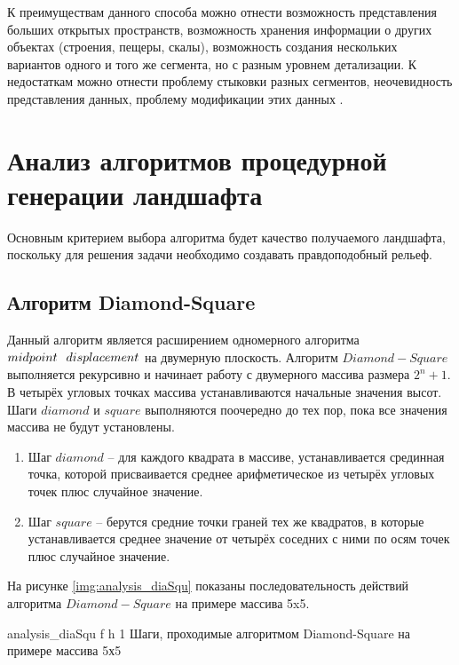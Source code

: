 К преимуществам данного способа можно отнести возможность представления больших открытых пространств, возможность хранения информации о других объектах (строения, пещеры, скалы), возможность создания нескольких вариантов одного и того же сегмента, но с разным уровнем детализации. 
К недостаткам можно отнести проблему стыковки разных сегментов, неочевидность представления данных, проблему модификации этих данных \cite{info_dataLandscapePresent}.

\section{Анализ алгоритмов процедурной генерации ландшафта}

Основным критерием выбора алгоритма будет качество получаемого ландшафта, поскольку для решения задачи необходимо создавать правдоподобный рельеф.

\subsection{Алгоритм Diamond-Square}

Данный алгоритм является расширением одномерного алгоритма $midpoint \hspace{0.25cm} displacement$ \cite{info_midpDipl} на двумерную плоскость. Алгоритм $Diamond-Square$ \cite{info_diaSqu} выполняется рекурсивно и начинает работу с двумерного массива размера $2^n + 1$. 
В четырёх угловых точках массива устанавливаются начальные значения высот. Шаги $diamond$ и $square$ выполняются поочередно до тех пор, пока все значения массива не будут установлены.

\begin{enumerate}[label={\arabic*)}]
    \item Шаг $diamond$ -- для каждого квадрата в массиве, устанавливается срединная точка, которой присваивается среднее арифметическое из четырёх угловых точек плюс случайное значение.
	\item Шаг $square$ -- берутся средние точки граней тех же квадратов, в которые устанавливается среднее значение от четырёх соседних с ними по осям точек плюс случайное значение.
\end{enumerate}

На рисунке \ref{img:analysis_diaSqu} показаны последовательность действий алгоритма $Diamond-Square$ на примере массива 5x5.

{analysis_diaSqu} %
{f} %
{h} %
{1\textwidth} %
{Шаги, проходимые алгоритмом Diamond-Square на примере массива 5х5 \cite{info_diaSquWiki}} %

